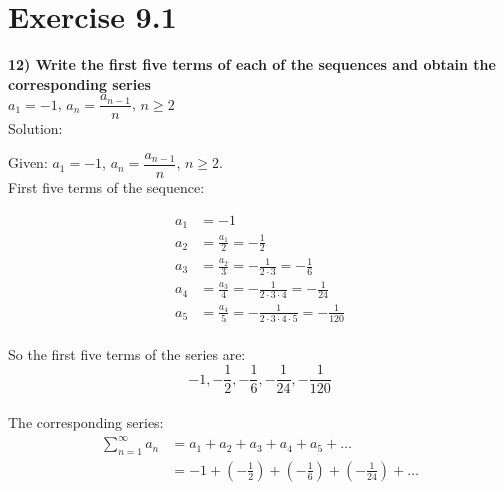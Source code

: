 \documentclass[journal,12pt,twocolumn]{IEEEtran}
\begin{document}


\vspace{3cm}

\title{}
\author{EE23BTECH11217 - Prajwal M$^{*}$
}
\maketitle
\newpage
\bigskip

\renewcommand{\thefigure}{\theenumi}
\renewcommand{\thetable}{\theenumi}

\section*{Exercise 9.1}

\noindent \textbf{12) \hspace{2pt}Write the first five terms of each of the sequences and obtain the corresponding series}\\

$a_1 = -1$, $a_n = \dfrac{a_{n-1}}{n}$, $n \geq 2$\\

\noindent Solution: 

\noindent Given: $a_1 = -1$, $a_n = \dfrac{a_{n-1}}{n}$, $n \geq 2$. \\

First five terms of the sequence:

\begin{align*}
a_1 & = -1 \\
a_2 & = \frac{a_1}{2} = -\frac{1}{2} \\
a_3 & = \frac{a_2}{3} = -\frac{1}{2 \cdot 3} = -\frac{1}{6}\\
a_4 & = \frac{a_3}{4} = -\frac{1}{2 \cdot 3 \cdot 4} = -\frac{1}{24}\\
a_5 & = \frac{a_4}{5} = -\frac{1}{2 \cdot 3 \cdot 4 \cdot 5} = -\frac{1}{120}
\end{align*} \\

So the first five terms of the series are: \\
\[-1 , -\frac{1}{2}, -\frac{1}{6}, -\frac{1}{24},  -\frac{1}{120}\] \\

The corresponding series:
\begin{align*}
    \sum_{n=1}^{\infty} a_n & = a_1 + a_2 + a_3 + a_4 + a_5 + \ldots \\
    & = -1 + \left(-\frac{1}{2}\right) + \left(-\frac{1}{6}\right) + \left(-\frac{1}{24}\right) + \ldots \\ 
\end{align*}
\end{document}
